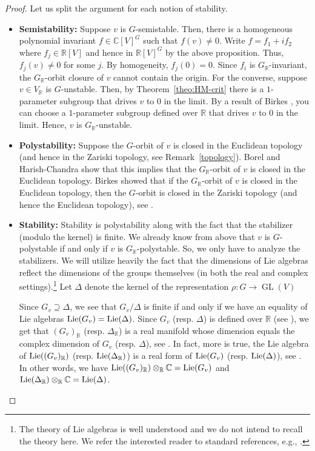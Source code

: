 \documentclass[11pt]{amsart}
\theoremstyle{definition}
\newcommand{\R}{{\mathbb R}}
\newcommand{\Lie} {{\rm Lie}}
\newcommand{\C}{{\mathbb C}}
\newcommand{\GL}{\operatorname{GL}}
\begin{document}
\begin{proof}
Let us split the argument for each notion of stability.
\begin{itemize}
\item {\bf Semistability:} Suppose $v$ is $G$-semistable. Then, there is a homogeneous polynomial invariant $f \in \C[V]^G$ such that $f(v) \neq 0$. Write $f = f_1 + i f_2$ where $f_j \in \R[V]$ and hence in $\R[V]^G$ by the above proposition. Thus, $f_j(v) \neq 0$ for some $j$. By homogeneity, $f_j(0) = 0$. Since $f_i$ is $G_\R$-invariant, the $G_\R$-orbit closure of $v$ cannot contain the origin. For the converse, suppose $v \in V_\R$ is $G$-unstable. Then, by Theorem~\ref{theo:HM-crit} there is a $1$-parameter subgroup that drives $v$ to $0$ in the limit. By a result of Birkes \cite[Theorem~5.2]{Birkes}, you can choose a $1$-parameter subgroup defined over $\R$ that drives $v$ to $0$ in the limit. Hence, $v$ is $G_\R$-unstable.

\item {\bf Polystability:} Suppose the $G$-orbit of $v$ is closed in the Euclidean topology (and hence in the Zariski topology, see Remark~\ref{topology}). Borel and Harish-Chandra \cite[Proposition~2.3]{BHC} show that this implies that the $G_\R$-orbit of $v$ is closed in the Euclidean topology. Birkes showed that if the $G_\R$-orbit of $v$ is closed in the Euclidean topology, then the $G$-orbit is closed in the Zariski topology (and hence the Euclidean topology), see \cite[Corollary~5.3]{Birkes}.

\item {\bf Stability:} Stability is polystability along with the fact that the stabilizer (modulo the kernel) is finite. We already know from above that $v$ is $G$-polystable if and only if $v$ is $G_\R$-polystable. So, we only have to analyze the stabilizers. We will utilize heavily the fact that the dimensions of  Lie algebras reflect the dimensions of the groups themselves (in both the real and complex settings).\footnote{The theory of Lie algebras is well understood and we do not intend to recall the theory here. We refer the interested reader to standard references, e.g., \cite{Borel-linalg, Borel-notes, BHC, Springer}.}  Let $\Delta$ denote the kernel of the representation $\rho: G \rightarrow \GL(V)$


Since $G_v \supseteq \Delta$, we see that $G_v/\Delta$ is finite if and only if we have an equality of Lie algebras $\Lie(G_v) = \Lie(\Delta)$. Since $G_v$ (resp. $\Delta$) is defined over $\R$ (see \cite[Proposition~12.1.2, Corollary~12.1.3]{Springer}), we get that $(G_v)_\R$ (resp. $\Delta_\R$) is a real manifold whose dimension equals the complex dimension of $G_v$ (resp. $\Delta$), see \cite[Section~5.2]{Borel-notes}. In fact, more is true, the Lie algebra of $\Lie((G_v)_\R)$ (resp. $\Lie(\Delta_\R)$) is a real form of $\Lie(G_v)$ (resp. $\Lie(\Delta)$), see \cite[Section~5.3]{Borel-notes}. In other words, we have $ \Lie((G_v)_\R) \otimes_\R \C = \Lie(G_v)$ and $\Lie(\Delta_\R) \otimes_\R \C = \Lie(\Delta)$. 





\end{itemize}
\end{proof}
\end{document}
